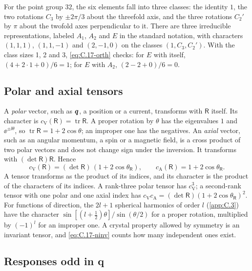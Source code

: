 For the point group $32$, the six elements fall into three classes: the identity $1$, the two rotations $C_3$ by $\pm2\pi/3$ about the threefold axis, and the three rotations $C_2'$ by $\pi$ about the twofold axes perpendicular to it. There are three irreducible representations, labeled $A_1$, $A_2$ and $E$ in the standard notation, with characters $(1, 1, 1)$, $(1, 1, -1)$ and $(2, -1, 0)$ on the classes $(1, C_3, C_2')$. With the class sizes 1, 2 and 3, \cref{eq:C.17-orth} checks: for $E$ with itself, $(4 + 2\cdot1 + 0)/6 = 1$; for $E$ with $A_2$, $(2 - 2 + 0)/6 = 0$.

\subsection{Polar and axial tensors}

A \emph{polar} vector, such as $\bm{q}$, a position or a current, transforms with $\mathsf{R}$ itself. Its character is $c_{\mathrm{V}}(\mathsf{R}) = \operatorname{tr}\mathsf{R}$. A proper rotation by $\theta$ has the eigenvalues $1$ and $\ee^{\pm\ii\theta}$, so $\operatorname{tr}\mathsf{R} = 1 + 2\cos\theta$; an improper one has the negatives. An \emph{axial} vector, such as an angular momentum, a spin or a magnetic field, is a cross product of two polar vectors and does not change sign under the inversion. It transforms with $(\det\mathsf{R})\mathsf{R}$. Hence
\begin{equation}
  c_{\mathrm{V}}(\mathsf{R}) = (\det\mathsf{R})\,(1 + 2\cos\theta_{\mathsf{R}}), \qquad
  c_{\mathrm{A}}(\mathsf{R}) = 1 + 2\cos\theta_{\mathsf{R}} .
  \label{eq:C.17-polar}
\end{equation}
A tensor transforms as the product of its indices, and its character is the product of the characters of its indices. A rank-three polar tensor has $c_{\mathrm{V}}^3$; a second-rank tensor with one polar and one axial index has $c_{\mathrm{V}}c_{\mathrm{A}} = (\det\mathsf{R})(1 + 2\cos\theta_{\mathsf{R}})^2$. For functions of direction, the $2l + 1$ spherical harmonics of order $l$ (\cref{app:C.3}) have the character $\sin[(l + \tfrac12)\theta]/\sin(\theta/2)$ for a proper rotation, multiplied by $(-1)^l$ for an improper one. A crystal property allowed by symmetry is an invariant tensor, and \cref{eq:C.17-ninv} counts how many independent ones exist.

\subsection{Responses odd in q}

